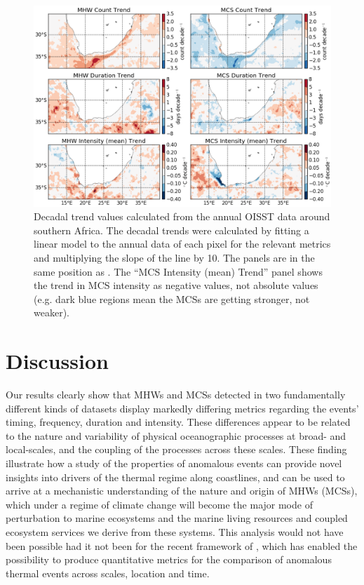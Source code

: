 \documentclass[a4paper,10pt,review]{elsarticle}
\begin{document}
\begin{figure}
\centering \includegraphics[width=1.0\textwidth]{MHW_MCS_trend.png}
\caption{Decadal trend values calculated from the annual OISST data around southern Africa. The decadal trends were calculated by fitting a linear model to the annual data of each pixel for the relevant metrics and multiplying the slope of the line by 10. The panels are in the same position as . The ``MCS Intensity (mean) Trend'' panel shows the trend in MCS intensity as negative values, not absolute values (e.g. dark blue regions mean the MCSs are getting stronger, not weaker).}
\label{fig:Figure7}
\end{figure}

\section{Discussion}
Our results clearly show that MHWs and MCSs detected in two fundamentally different kinds of datasets display markedly differing metrics regarding the events' timing, frequency, duration and intensity. These differences appear to be related to the nature and variability of physical oceanographic processes at broad- and local-scales, and the coupling of the processes across these scales. These finding illustrate how a study of the properties of anomalous events can provide novel insights into drivers of the thermal regime along coastlines, and can be used to arrive at a mechanistic understanding of the nature and origin of MHWs (MCSs), which under a regime of climate change will become the major mode of perturbation to marine ecosystems and the marine living resources and coupled ecosystem services we derive from these systems. This analysis would not have been possible had it not been for the recent framework of \citet{Hobday2016}, which has enabled the possibility to produce quantitative metrics for the comparison of anomalous thermal events across scales, location and time.
\end{document}
